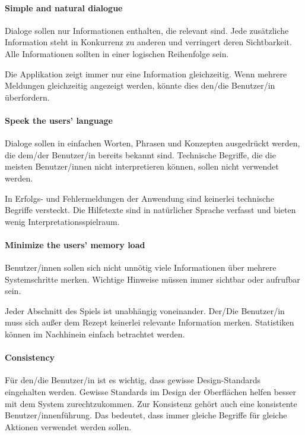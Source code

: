 \paragraph{Simple and natural dialogue}
Dialoge sollen nur Informationen enthalten, die relevant sind. Jede zusätzliche Information steht in Konkurrenz zu anderen und verringert deren Sichtbarkeit. Alle Informationen sollten in einer logischen Reihenfolge sein. \cite{nielsen:1993:usability}

Die Applikation zeigt immer nur eine Information gleichzeitig. Wenn mehrere Meldungen gleichzeitig angezeigt werden, könnte dies den/die Benutzer/in überfordern.

\paragraph{Speek the users' language}
Dialoge sollen in einfachen Worten, Phrasen und Konzepten ausgedrückt werden, die dem/der Benutzer/in bereits bekannt sind. Technische Begriffe, die die meisten Benutzer/innen nicht interpretieren können, sollen nicht verwendet werden. \cite{nielsen:1993:usability}

In Erfolgs- und Fehlermeldungen der Anwendung sind keinerlei technische Begriffe versteckt. Die Hilfetexte sind in natürlicher Sprache verfasst und bieten wenig Interpretationsspielraum.

\paragraph{Minimize the users' memory load}
Benutzer/innen sollen sich nicht unnötig viele Informationen über mehrere Systemschritte merken. Wichtige Hinweise müssen immer sichtbar oder aufrufbar sein. \cite{nielsen:1993:usability}

Jeder Abschnitt des Spiels ist unabhängig voneinander. Der/Die Benutzer/in muss sich außer dem Rezept keinerlei relevante Information merken. Statistiken können im Nachhinein einfach betrachtet werden.

\paragraph{Consistency}
Für den/die Benutzer/in ist es wichtig, dass gewisse Design-Standards eingehalten werden. Gewisse Standards im Design der Oberflächen helfen besser mit dem System zurechtzukommen. Zur Konsistenz gehört auch eine konsistente Benutzer/innenführung. Das bedeutet, dass immer gleiche Begriffe für gleiche Aktionen verwendet werden sollen. \cite{nielsen:1993:usability}

